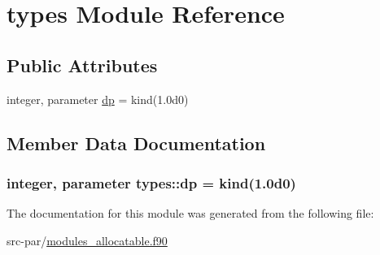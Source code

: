 \hypertarget{classtypes}{\section{types Module Reference}
\label{classtypes}
}
\subsection*{Public Attributes}
\begin{DoxyCompactItemize}
\item 
integer, parameter \hyperlink{classtypes_ae06c1dae43e034bf356efed296ae430a}{dp} = kind(1.\-0d0)
\end{DoxyCompactItemize}


\subsection{Member Data Documentation}
\hypertarget{classtypes_ae06c1dae43e034bf356efed296ae430a}{
\subsubsection[{dp}]{\setlength{\rightskip}{0pt plus 5cm}integer, parameter types\-::dp = kind(1.\-0d0)}}\label{classtypes_ae06c1dae43e034bf356efed296ae430a}


The documentation for this module was generated from the following file\-:\begin{DoxyCompactItemize}
\item 
src-\/par/\hyperlink{modules__allocatable_8f90}{modules\-\_\-allocatable.\-f90}\end{DoxyCompactItemize}
